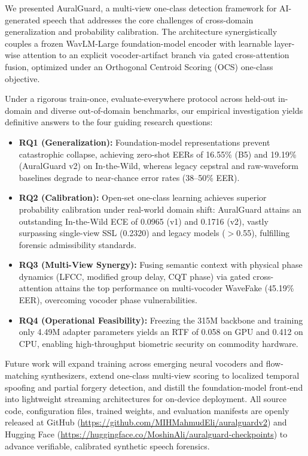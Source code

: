 
We presented AuralGuard, a multi-view one-class detection framework for AI-generated speech that addresses the core challenges of cross-domain generalization and probability calibration. The architecture synergistically couples a frozen WavLM-Large foundation-model encoder with learnable layer-wise attention to an explicit vocoder-artifact branch via gated cross-attention fusion, optimized under an Orthogonal Centroid Scoring (OCS) one-class objective.

Under a rigorous train-once, evaluate-everywhere protocol across held-out in-domain and diverse out-of-domain benchmarks, our empirical investigation yields definitive answers to the four guiding research questions:
\begin{itemize}
    \item \textbf{RQ1 (Generalization):} Foundation-model representations prevent catastrophic collapse, achieving zero-shot EERs of 16.55\% (B5) and 19.19\% (AuralGuard v2) on In-the-Wild, whereas legacy cepstral and raw-waveform baselines degrade to near-chance error rates (38--50\% EER).
    \item \textbf{RQ2 (Calibration):} Open-set one-class learning achieves superior probability calibration under real-world domain shift: AuralGuard attains an outstanding In-the-Wild ECE of 0.0965 (v1) and 0.1716 (v2), vastly surpassing single-view SSL (0.2320) and legacy models ($>$0.55), fulfilling forensic admissibility standards.
    \item \textbf{RQ3 (Multi-View Synergy):} Fusing semantic context with physical phase dynamics (LFCC, modified group delay, CQT phase) via gated cross-attention attains the top performance on multi-vocoder WaveFake (45.19\% EER), overcoming vocoder phase vulnerabilities.
    \item \textbf{RQ4 (Operational Feasibility):} Freezing the 315M backbone and training only 4.49M adapter parameters yields an RTF of 0.058 on GPU and 0.412 on CPU, enabling high-throughput biometric security on commodity hardware.
\end{itemize}

Future work will expand training across emerging neural vocoders and flow-matching synthesizers, extend one-class multi-view scoring to localized temporal spoofing and partial forgery detection, and distill the foundation-model front-end into lightweight streaming architectures for on-device deployment. All source code, configuration files, trained weights, and evaluation manifests are openly released at GitHub (\url{https://github.com/MIHMahmudEli/auralguardv2}) and Hugging Face (\url{https://huggingface.co/MoshinAli/auralguard-checkpoints}) to advance verifiable, calibrated synthetic speech forensics.
